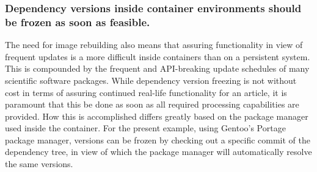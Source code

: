 \subsubsection{Dependency versions inside container environments should be frozen as soon as feasible.}
The need for image rebuilding also means that assuring functionality in view of frequent updates is a more difficult inside containers than on a persistent system.
This is compounded by the frequent and API-breaking update schedules of many scientific software packages.
While dependency version freezing is not without cost in terms of assuring continued real-life functionality for an article, it is paramount that this be done as soon as all required processing capabilities are provided.
How this is accomplished differs greatly based on the package manager used inside the container.
For the present example, using Gentoo's Portage package manager, versions can be frozen by checking out a specific commit of the dependency tree, in view of which the package manager will automatically resolve the same versions.

